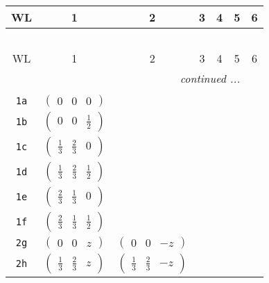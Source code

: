 \documentclass[fleqn,9pt,landscape]{jsarticle}
\begin{document}
\begin{center}
\renewcommand{\arraystretch}{1.2}
\begin{longtable}{ccccccc}
 \hline \hline
WL & 1 & 2 & 3 & 4 & 5 & 6 \\ \hline \endfirsthead

\multicolumn{6}{l}{\tablename\ \thetable{}} \\
 \hline \hline
WL & 1 & 2 & 3 & 4 & 5 & 6 \\ \hline \endhead

 \hline \hline
\multicolumn{6}{r}{\footnotesize\it continued ...} \\ \endfoot

 \hline \hline
\multicolumn{6}{r}{} \\ \endlastfoot

{\tt 1a} & $ \begin{pmatrix} 0 & 0 & 0 \end{pmatrix} $ & $  $ & $  $ & $  $ & $  $ & $  $ \\ \hline
{\tt 1b} & $ \begin{pmatrix} 0 & 0 & \frac{1}{2} \end{pmatrix} $ & $  $ & $  $ & $  $ & $  $ & $  $ \\ \hline
{\tt 1c} & $ \begin{pmatrix} \frac{1}{3} & \frac{2}{3} & 0 \end{pmatrix} $ & $  $ & $  $ & $  $ & $  $ & $  $ \\ \hline
{\tt 1d} & $ \begin{pmatrix} \frac{1}{3} & \frac{2}{3} & \frac{1}{2} \end{pmatrix} $ & $  $ & $  $ & $  $ & $  $ & $  $ \\ \hline
{\tt 1e} & $ \begin{pmatrix} \frac{2}{3} & \frac{1}{3} & 0 \end{pmatrix} $ & $  $ & $  $ & $  $ & $  $ & $  $ \\ \hline
{\tt 1f} & $ \begin{pmatrix} \frac{2}{3} & \frac{1}{3} & \frac{1}{2} \end{pmatrix} $ & $  $ & $  $ & $  $ & $  $ & $  $ \\ \hline
{\tt 2g} & $ \begin{pmatrix} 0 & 0 & z \end{pmatrix} $ & $ \begin{pmatrix} 0 & 0 & - z \end{pmatrix} $ & $  $ & $  $ & $  $ & $  $ \\ \hline
{\tt 2h} & $ \begin{pmatrix} \frac{1}{3} & \frac{2}{3} & z \end{pmatrix} $ & $ \begin{pmatrix} \frac{1}{3} & \frac{2}{3} & - z \end{pmatrix} $ & $  $ & $  $ & $  $ & $  $ \\ \hline

\end{longtable}
\end{center}
\end{document}
